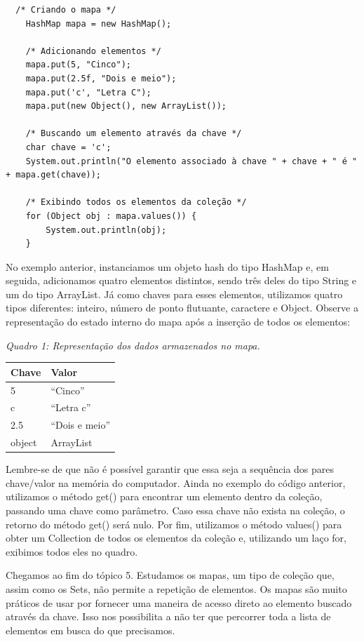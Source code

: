 \documentclass[11pt]{article}
\begin{document}
\begin{verbatim}
  /* Criando o mapa */
    HashMap mapa = new HashMap();

    /* Adicionando elementos */
    mapa.put(5, "Cinco");
    mapa.put(2.5f, "Dois e meio");
    mapa.put('c', "Letra C");
    mapa.put(new Object(), new ArrayList());

    /* Buscando um elemento através da chave */
    char chave = 'c';
    System.out.println("O elemento associado à chave " + chave + " é " + mapa.get(chave));

    /* Exibindo todos os elementos da coleção */
    for (Object obj : mapa.values()) {
        System.out.println(obj);
    }
\end{verbatim}

No exemplo anterior, instanciamos um objeto hash do tipo HashMap e, em seguida, adicionamos quatro elementos distintos, sendo três deles do tipo String e um do tipo ArrayList. Já como chaves para esses elementos, utilizamos quatro tipos diferentes: inteiro, número de ponto flutuante, caractere e Object. Observe a representação do estado interno do mapa após a inserção de todos os elementos:

\emph{Quadro 1: Representação dos dados armazenados no mapa.}
\begin{center}
\begin{tabular}{ll}
Chave & Valor\\
\hline
5 & ``Cinco''\\
c & ``Letra c''\\
2.5 & ``Dois e meio''\\
object & ArrayList\\
\end{tabular}
\end{center}

Lembre-se de que não é possível garantir que essa seja a sequência dos pares chave/valor na memória do computador. Ainda no exemplo do código anterior, utilizamos o método get() para encontrar um elemento dentro da coleção, passando uma chave como parâmetro. Caso essa chave não exista na coleção, o retorno do método get() será nulo. Por fim, utilizamos o método values() para obter um Collection de todos os elementos da coleção e, utilizando um laço for, exibimos todos eles no quadro.

Chegamos ao fim do tópico 5. Estudamos os mapas, um tipo de coleção que, assim como os Sets, não permite a repetição de elementos. Os mapas são muito práticos de usar por fornecer uma maneira de acesso direto ao elemento buscado através da chave. Isso nos possibilita a não ter que percorrer toda a lista de elementos em busca do que precisamos.
\end{document}
